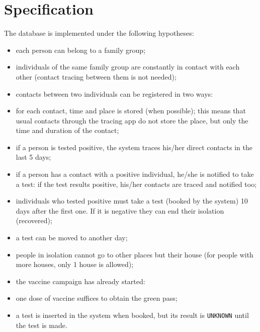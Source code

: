 \documentclass{article}
\begin{document}
\section{Specification}
The database is implemented under the following hypotheses:
\begin{itemize}
\item each person can belong to a family group;
\item individuals of the same family group are constantly in contact with each other (contact tracing between them is not needed);
\item contacts between two individuals can be registered in two ways:
\item for each contact, time and place is stored (when possible); this means that usual contacts through the tracing app do not store the place, but only the time and duration of the contact;
\item if a person is tested positive, the system traces his/her direct contacts in the last 5 days;
\item if a person has a contact with a positive individual, he/she is notified to take a test: if the test results positive, his/her contacts are traced and notified too;
\item individuals who tested positive must take a test (booked by the system) 10 days after the first one. If it is negative they can end their isolation (recovered);
\item a test can be moved to another day;
\item people in isolation cannot go to other places but their house (for people with more houses, only 1 house is allowed);
\item the vaccine campaign has already started:
\item one dose of vaccine suffices to obtain the green pass;
\item a test is inserted in the system when booked, but its result is \verb |UNKNOWN| until the test is made.
\end{itemize}
\end{document}
